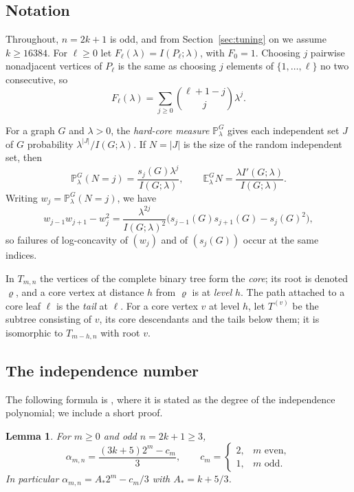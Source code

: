 \documentclass{amsart}
\newtheorem{lemma}[theorem]{Lemma}
\theoremstyle{definition}
\theoremstyle{remark}
\numberwithin{equation}{section}
\newcommand{\E}{\mathbb{E}}
\newcommand{\Prob}{\mathbb{P}}
\newcommand{\abs}[1]{\lvert #1\rvert}
\begin{document}
\subsection{Notation}

Throughout, $n=2k+1$ is odd, and from Section~\ref{sec:tuning} on we assume $k\ge16384$. For $\ell\ge0$ let $F_\ell(\lambda)=I(P_\ell;\lambda)$, with $F_0=1$. Choosing $j$ pairwise nonadjacent vertices of $P_\ell$ is the same as choosing $j$ elements of $\{1,\dots,\ell\}$ no two consecutive, so
\begin{equation}\label{eq:pathpoly}
F_\ell(\lambda)=\sum_{j\ge0}\binom{\ell+1-j}{j}\lambda^j .
\end{equation}

For a graph $G$ and $\lambda>0$, the \emph{hard-core measure} $\Prob^G_\lambda$ gives each independent set $J$ of $G$ probability $\lambda^{\abs{J}}/I(G;\lambda)$. If $N=\abs{J}$ is the size of the random independent set, then
\begin{equation}\label{eq:tilt}
\Prob^G_\lambda(N=j)=\frac{s_j(G)\lambda^j}{I(G;\lambda)},
\qquad
\E^G_\lambda N=\frac{\lambda I'(G;\lambda)}{I(G;\lambda)} .
\end{equation}
Writing $w_j=\Prob^G_\lambda(N=j)$, we have
\begin{equation}\label{eq:tiltsign}
w_{j-1}w_{j+1}-w_j^2=\frac{\lambda^{2j}}{I(G;\lambda)^2}\bigl(s_{j-1}(G)s_{j+1}(G)-s_j(G)^2\bigr),
\end{equation}
so failures of log-concavity of $(w_j)$ and of $(s_j(G))$ occur at the same indices.

In $T_{m,n}$ the vertices of the complete binary tree form the \emph{core}; its root is denoted $\varrho$, and a core vertex at distance $h$ from $\varrho$ is at \emph{level} $h$. The path attached to a core leaf $\ell$ is the \emph{tail} at $\ell$. For a core vertex $v$ at level $h$, let $T^{(v)}$ be the subtree consisting of $v$, its core descendants and the tails below them; it is isomorphic to $T_{m-h,n}$ with root $v$.

\subsection{The independence number}

The following formula is \cite[Lemma~15]{BR26}, where it is stated as the degree of the independence polynomial; we include a short proof.

\begin{lemma}\label{lem:alpha}
For $m\ge0$ and odd $n=2k+1\ge3$,
\[
\alpha_{m,n}=\frac{(3k+5)2^m-c_m}{3},\qquad c_m=\begin{cases}2,& m \text{ even},\\ 1,& m\text{ odd}.\end{cases}
\]
In particular $\alpha_{m,n}=A_*2^m-c_m/3$ with $A_*=k+5/3$.
\end{lemma}
\end{document}
